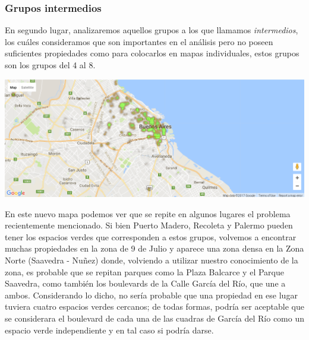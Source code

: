 \documentclass[a4paper, 10pt]{article}
\newcommand\tab[1][0.5cm]{\hspace*{#1}}
\begin{document}
			\subsubsection{Grupos intermedios}
				En segundo lugar, analizaremos aquellos grupos a los que llamamos \emph{intermedios}, los cuáles consideramos
				que son importantes en el análisis pero no poseen suficientes propiedades como para colocarlos en mapas individuales,
				estos grupos son los grupos del 4 al 8.
				\begin{center}
					\includegraphics[width=\textwidth]{images/parksMiddle}
				\end{center}
				\tab En este nuevo mapa podemos ver que se repite en algunos lugares el problema recientemente mencionado. Si bien 
				Puerto Madero, Recoleta y Palermo pueden tener los espacios verdes que corresponden a estos grupos, volvemos a 
				encontrar muchas propiedades en la zona de 9 de Julio y aparece una zona densa en la Zona Norte (Saavedra - Nuñez) 
				donde, volviendo a utilizar nuestro conocimiento de la zona, es probable que se repitan parques como la Plaza 
				Balcarce y el Parque Saavedra, como también los boulevards de la Calle García del Río, que une a ambos. Considerando 
				lo dicho, no sería probable que una propiedad en ese lugar tuviera cuatro espacios verdes cercanos; de todas formas, 
				podría ser aceptable que se considerara el boulevard de cada una de las cuadras de García del Río como un espacio
				verde independiente y en tal caso si podría darse. \\
\end{document}
